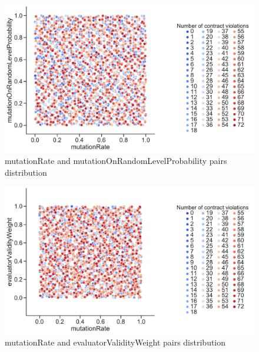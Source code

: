 \begin{figure}
	\centering
	\includegraphics[width=\textwidth]{images/PairsDistr/mutationRate_mutationOnRandomLevelProbability.pdf}
	\caption[mutationRate and mutationOnRandomLevelProbability pairs distribution]{mutationRate and mutationOnRandomLevelProbability pairs distribution}
	\label{fig:mutationRate_mutationOnRandomLevelProbability_pair}
\end{figure}
\begin{figure}
	\centering
	\includegraphics[width=\textwidth]{images/PairsDistr/mutationRate_evaluatorValidityWeight.pdf}
	\caption[mutationRate and evaluatorValidityWeight pairs distribution]{mutationRate and evaluatorValidityWeight pairs distribution}
	\label{fig:mutationRate_evaluatorValidityWeight_pair}
\end{figure}

